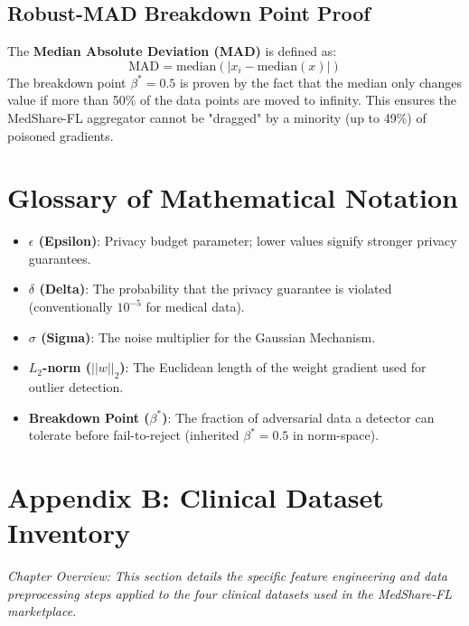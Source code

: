 \documentclass[10pt, a4paper, twocolumn]{article}
\begin{document}
\subsection*{Robust-MAD Breakdown Point Proof}
The \textbf{Median Absolute Deviation (MAD)} is defined as:
\begin{equation}
    \text{MAD} = \text{median}(|x_i - \text{median}(x)|)
\end{equation}
The breakdown point $\beta^* = 0.5$ is proven by the fact that the median only changes value if more than 50\% of the data points are moved to infinity. This ensures the MedShare-FL aggregator cannot be "dragged" by a minority (up to 49\%) of poisoned gradients.

\section*{Glossary of Mathematical Notation}
\begin{itemize}
    \item \textbf{$\epsilon$ (Epsilon)}: Privacy budget parameter; lower values signify stronger privacy guarantees.
    \item \textbf{$\delta$ (Delta)}: The probability that the privacy guarantee is violated (conventionally $10^{-5}$ for medical data).
    \item \textbf{$\sigma$ (Sigma)}: The noise multiplier for the Gaussian Mechanism.
    \item \textbf{$L_2$-norm ($||w||_2$)}: The Euclidean length of the weight gradient used for outlier detection.
    \item \textbf{Breakdown Point ($\beta^*$)}: The fraction of adversarial data a detector can tolerate before fail-to-reject (inherited $\beta^*=0.5$ in norm-space).
\end{itemize}

\section*{Appendix B: Clinical Dataset Inventory}

\textit{Chapter Overview: This section details the specific feature engineering and data preprocessing steps applied to the four clinical datasets \cite{quinlan1987} used in the MedShare-FL marketplace.}
\end{document}
